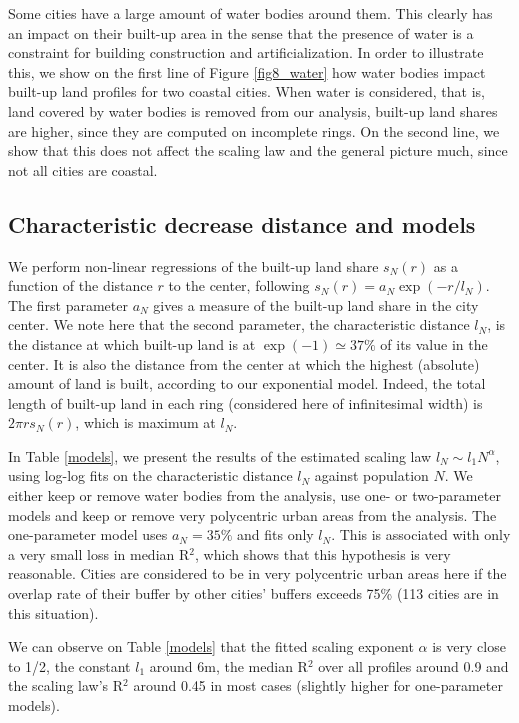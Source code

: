 \documentclass[sn-mathphys-num]{sn-jnl}%
\theoremstyle{thmstyleone}%
\theoremstyle{thmstyletwo}%
\theoremstyle{thmstylethree}%
\begin{document}
Some cities have a large amount of water bodies around them. This clearly has an impact on their built-up area in the sense that the presence of water is a constraint for building construction and artificialization. In order to illustrate this, we show on the first line of Figure \ref{fig8_water} how water bodies impact built-up land profiles for two coastal cities. When water is considered, that is, land covered by water bodies is removed from our analysis, built-up land shares are higher, since they are computed on incomplete rings. On the second line, we show that this does not affect the scaling law and the general picture much, since not all cities are coastal.

\subsection*{Characteristic decrease distance and models}

We perform non-linear regressions of the built-up land share $s_N(r)$ as a function of the distance $r$ to the center, following $s_N(r)=a_N \exp(-r/l_N)$. The first parameter $a_N$ gives a measure of the built-up land share in the city center. We note here that the second parameter, the characteristic distance $l_N$, is the distance at which built-up land is at $\exp(-1)\simeq 37\%$ of its value in the center. It is also the distance from the center at which the highest (absolute) amount of land is built, according to our exponential model. Indeed, the total length of built-up land in each ring (considered here of infinitesimal width) is $2\pi r s_N(r)$, which is maximum at $l_N$.

In Table \ref{models}, we present the results of the estimated scaling law $l_N\sim l_1 N^{\alpha}$, using log-log fits on the characteristic distance $l_N$ against population $N$. We either keep or remove water bodies from the analysis, use one- or two-parameter models and keep or remove very polycentric urban areas from the analysis. The one-parameter model uses $a_N=35\%$ and fits only $l_N$. This is associated with only a very small loss in median R$^2$, which shows that this hypothesis is very reasonable. Cities are considered to be in very polycentric urban areas here if the overlap rate of their buffer by other cities' buffers exceeds 75\% (113 cities are in this situation).

We can observe on Table \ref{models} that the fitted scaling exponent $\alpha$ is very close to 1/2, the constant $l_1$ around 6m, the median R$^2$ over all profiles around 0.9 and the scaling law's R$^2$ around 0.45 in most cases (slightly higher for one-parameter models).
\end{document}
